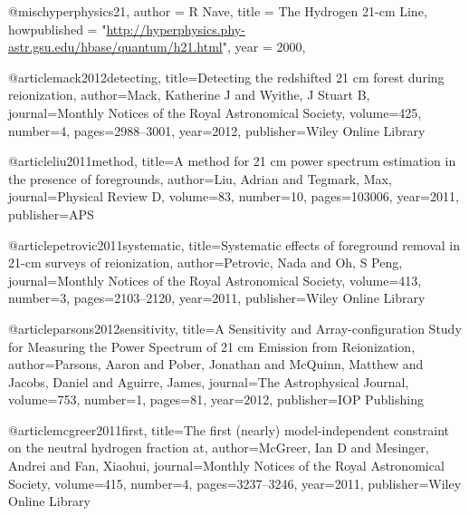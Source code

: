 


@misc{hyperphysics21,
  author 		= {R Nave},
  title 		= {{The Hydrogen 21-cm Line}},
  howpublished  = "\url{http://hyperphysics.phy-astr.gsu.edu/hbase/quantum/h21.html}",
  year 			= {2000},
}


@article{mack2012detecting,
  title={Detecting the redshifted 21 cm forest during reionization},
  author={Mack, Katherine J and Wyithe, J Stuart B},
  journal={Monthly Notices of the Royal Astronomical Society},
  volume={425},
  number={4},
  pages={2988--3001},
  year={2012},
  publisher={Wiley Online Library}
}

@article{liu2011method,
  title={A method for 21 cm power spectrum estimation in the presence of foregrounds},
  author={Liu, Adrian and Tegmark, Max},
  journal={Physical Review D},
  volume={83},
  number={10},
  pages={103006},
  year={2011},
  publisher={APS}
}

@article{petrovic2011systematic,
  title={Systematic effects of foreground removal in 21-cm surveys of reionization},
  author={Petrovic, Nada and Oh, S Peng},
  journal={Monthly Notices of the Royal Astronomical Society},
  volume={413},
  number={3},
  pages={2103--2120},
  year={2011},
  publisher={Wiley Online Library}
}

@article{parsons2012sensitivity,
  title={A Sensitivity and Array-configuration Study for Measuring the Power Spectrum of 21 cm Emission from Reionization},
  author={Parsons, Aaron and Pober, Jonathan and McQuinn, Matthew and Jacobs, Daniel and Aguirre, James},
  journal={The Astrophysical Journal},
  volume={753},
  number={1},
  pages={81},
  year={2012},
  publisher={IOP Publishing}
}

@article{mcgreer2011first,
  title={The first (nearly) model-independent constraint on the neutral hydrogen fraction at},
  author={McGreer, Ian D and Mesinger, Andrei and Fan, Xiaohui},
  journal={Monthly Notices of the Royal Astronomical Society},
  volume={415},
  number={4},
  pages={3237--3246},
  year={2011},
  publisher={Wiley Online Library}
}

